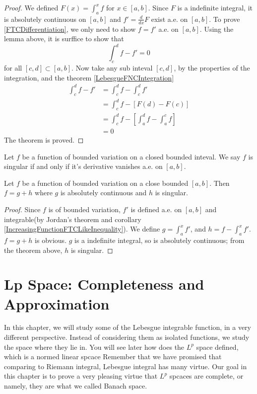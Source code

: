 \documentclass[lang=en, 12pt]{elegantbook}
\begin{document}
            \begin{proof}
                We defined $F(x) = \int_a^x f$ for $x\in [a,b]$.
            Since $F$ is a indefinite integral, it is absolutely
            continuous on $[a,b]$ and $f' = \frac{d}{dx} F $ exist a.e. on $[a,b]$.
            To prove \eqref{FTCDifferentiation}, we only need to show 
            $f = f'$ a.e. on $[a,b]$. Using the lemma above, 
            it is surffice to show that 
            $$\int_c^d f -f' = 0$$
            for all $[c,d] \subset [a,b]$. Now take any sub inteval $[c,d]$,
            by the properties of the integration, and the theorem \ref{LebesgueFNCIntegration}
            \begin{equation*}
                \begin{aligned}
                    \int_c^d f -f' &= \int_c^d f -\int_c^df'\\
                    &=\int_c^d f - [F(d) -F(c)]\\
                    &=\int_c^d f - [\int_a^d f -\int_a^c f ]\\
                    &= 0 
                \end{aligned}
            \end{equation*}
            The theorem is proved.
            \end{proof}
            \begin{definition}[Singular]
                Let $f$ be a function of bounded variation on a closed bounded
            inteval. We say $f$ is singular if and only if it's derivative vanishes
            a.e. on $[a,b]$.
            \end{definition}
            \begin{theorem}
                Let $f$ be a function of bounded variation on a 
            close bounded $[a,b]$. Then $f = g +h$ where $g$ is absolutely
            continuous and $h$ is singular.
            \end{theorem}
            \begin{proof}
                Since $f$ is of bounded variation, $f'$ is defined 
            a.e. on $[a,b]$ and integrable(by Jordan's theorem and corollary \ref{IncreasingFunctionFTCLikeInequality}). 
                We define $g = \int_a^x f'$, and $h = f -\int_a^x f'$.
                $f=g+h$ is obvious. $g$ is a indefinite integral, so is 
            absolutely continuous; from the theorem above, $h$ is singular.
            \end{proof}
\chapter{Lp Space: Completeness and Approximation}
    In this chapter, we will study some of the Lebesgue integrable function,
in a very different perspective. Instead of considering them as 
isolated functions, we study the space where they lie in.
You will see later how does the $L^p$ space defined, which
is a normed linear spcace 
Remember that 
we have promised that comparing to Riemann integral, Lebesgue integral has many virtue.
Our goal in this chapter is to prove a very pleasing virtue that 
$L^p$ spcaces are complete, or namely, they are what we called 
Banach space.
\end{document}
